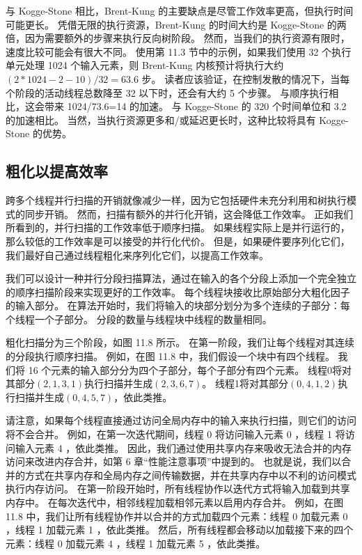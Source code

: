 与 Kogge-Stone 相比，Brent-Kung 的主要缺点是尽管工作效率更高，但执行时间可能更长。 凭借无限的执行资源，Brent-Kung 的时间大约是 Kogge-Stone 的两倍，因为需要额外的步骤来执行反向树阶段。 然而，当我们的执行资源有限时，速度比较可能会有很大不同。 使用第 11.3 节中的示例，如果我们使用 32 个执行单元处理 1024 个输入元素，则 Brent-Kung 内核预计将执行大约 $(2 * 1024-2-10) / 32=63.6$ 步。 读者应该验证，在控制发散的情况下，当每个阶段的活动线程总数降至 32 以下时，还会有大约 5 个步骤。 与顺序执行相比，这会带来 1024/73.6=14 的加速。 与 Kogge-Stone 的 320 个时间单位和 3.2 的加速相比。 当然，当执行资源更多和/或延迟更长时，这种比较将具有 Kogge-Stone 的优势。

\subsection{粗化以提高效率}
跨多个线程并行扫描的开销就像减少一样，因为它包括硬件未充分利用和树执行模式的同步开销。 然而，扫描有额外的并行化开销，这会降低工作效率。 正如我们所看到的，并行扫描的工作效率低于顺序扫描。 如果线程实际上是并行运行的，那么较低的工作效率是可以接受的并行化代价。 但是，如果硬件要序列化它们，我们最好自己通过线程粗化来序列化它们，以提高工作效率。

我们可以设计一种并行分段扫描算法，通过在输入的各个分段上添加一个完全独立的顺序扫描阶段来实现更好的工作效率。 每个线程块接收比原始部分大粗化因子的输入部分。 在算法开始时，我们将输入的块部分划分为多个连续的子部分：每个线程一个子部分。 分段的数量与线程块中线程的数量相同。

粗化扫描分为三个阶段，如图 11.8 所示。 在第一阶段，我们让每个线程对其连续的分段执行顺序扫描。 例如，在图 11.8 中，我们假设一个块中有四个线程。 我们将 16 个元素的输入部分分为四个子部分，每个子部分有四个元素。 线程0将对其部分$(2,1,3,1)$执行扫描并生成$(2,3,6,7)$。 线程1将对其部分$(0,4,1,2)$执行扫描并生成$(0,4,5,7)$，依此类推。

请注意，如果每个线程直接通过访问全局内存中的输入来执行扫描，则它们的访问将不会合并。 例如，在第一次迭代期间，线程 0 将访问输入元素 0 ，线程 1 将访问输入元素 4 ，依此类推。 因此，我们通过使用共享内存来吸收无法合并的内存访问来改进内存合并，如第 6 章“性能注意事项”中提到的。 也就是说，我们以合并的方式在共享内存和全局内存之间传输数据，并在共享内存中以不利的访问模式执行内存访问。 在第一阶段开始时，所有线程协作以迭代方式将输入加载到共享内存中。 在每次迭代中，相邻线程加载相邻元素以启用内存合并。 例如，在图 11.8 中，我们让所有线程协作并以合并的方式加载四个元素：线程 0 加载元素 0 ，线程 1 加载元素 1 ，依此类推。 然后，所有线程都会移动以加载接下来的四个元素：线程 0 加载元素 4 ，线程 1 加载元素 5 ，依此类推。

